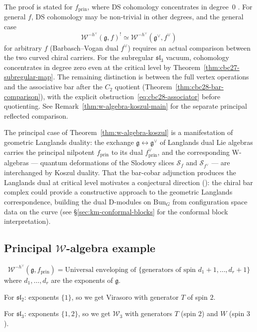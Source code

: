 \begin{remark}
\label{rem:w-koszul-general-nilpotent}
The proof is stated for $f_{\mathrm{prin}}$, where DS cohomology concentrates in degree~$0$ \cite{FF}.  For general $f$, DS cohomology may be non-trivial in other degrees, and the general case
\[
\mathcal{W}^{-h^\vee}(\mathfrak{g}, f)^! \simeq \mathcal{W}^{-h^\vee}(\mathfrak{g}^\vee, f^\vee)
\]
for arbitrary $f$ (Barbasch--Vogan dual $f^\vee$) requires an actual comparison between the two curved chiral carriers.
For the subregular $\mathfrak{sl}_3$ vacuum, cohomology concentrates in degree zero even at the critical level by Theorem~\ref{thm:cbc27-subregular-map}.
The remaining distinction is between the full vertex operations and the associative bar after the $C_2$ quotient
(Theorem~\ref{thm:cbc28-bar-comparison}), with the explicit obstruction~\eqref{eq:cbc28-associator} before quotienting.
See Remark~\ref{thm:w-algebra-koszul-main} for the separate principal reflected comparison.
\end{remark}

\begin{remark}
The principal case of Theorem~\ref{thm:w-algebra-koszul} is a manifestation of geometric Langlands duality: the exchange $\mathfrak{g} \leftrightarrow \mathfrak{g}^\vee$ of Langlands dual Lie algebras carries the principal nilpotent $f_{\mathrm{prin}}$ to its dual $f^\vee_{\mathrm{prin}}$, and the corresponding W-algebras --- quantum deformations of the Slodowy slices $\mathcal{S}_f$ and $\mathcal{S}_{f^\vee}$ --- are interchanged by Koszul duality.  That the bar-cobar adjunction produces the Langlands dual at critical level motivates a conjectural direction (\ClaimStatusConjectured): the chiral bar complex could provide a constructive approach to the geometric Langlands correspondence, building the dual D-modules on $\mathrm{Bun}_G$ from configuration space data on the curve (see \S\ref{sec:km-conformal-blocks} for the conformal block interpretation).
\end{remark}

\subsection{Principal $\mathcal{W}$-algebra example}

\begin{theorem}
\label{thm:principal-w-algebra-structure}
\begin{equation}
\mathcal{W}^{-h^\vee}(\mathfrak{g}, f_{\mathrm{prin}}) = \text{Universal enveloping of } \{\text{generators of spin } d_1+1, \ldots, d_r+1\}
\end{equation}
where $d_1, \ldots, d_r$ are the exponents of $\mathfrak{g}$.

For $\mathfrak{sl}_2$: exponents $\{1\}$, so we get Virasoro with generator $T$ of spin $2$.

For $\mathfrak{sl}_3$: exponents $\{1,2\}$, so we get $\mathcal{W}_3$ with generators $T$ (spin $2$) and $W$ (spin $3$).
\end{theorem}

